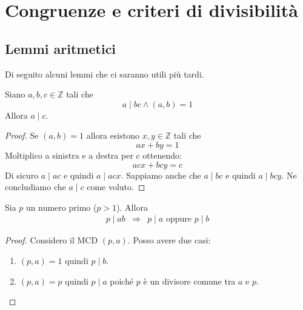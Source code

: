 \section{Congruenze e criteri di divisibilit\`a}

\subsection{Lemmi aritmetici}
Di seguito alcuni lemmi che ci saranno utili pi\`u tardi.

\begin{lemma}
	Siano $a, b, c \in \mathbb{Z}$ tali che
	\begin{equation*}
		a \mid bc \wedge (a, b) = 1
	\end{equation*}
	Allora $a \mid c$.
	\begin{proof}
		Se $(a, b) = 1$ allora esistono $x, y \in \mathbb{Z}$ tali che
		\begin{equation*}
			ax + by = 1
		\end{equation*}
		Moltiplico a sinistra e a destra per $c$ ottenendo:
		\begin{equation*}
			acx + bcy = c
		\end{equation*}
		Di sicuro $a \mid ac$ e quindi $a \mid acx$. Sappiamo anche che $a \mid bc$ e quindi
		$a \mid bcy$. Ne concludiamo che $a \mid c$ come voluto.
	\end{proof}
\end{lemma}

\begin{lemma}
	Sia $p$ un numero primo ($p > 1$). Allora
	\begin{equation*}
		\begin{array}{lll}
			p \mid ab & \Rightarrow & p \mid a \text{ oppure } p \mid b
		\end{array}
	\end{equation*}
	\begin{proof}
		Considero il MCD $(p, a)$. Posso avere due casi:
		\begin{enumerate}
			\item $(p, a) = 1$ quindi $p \mid b$.
			\item $(p, a) = p$ quindi $p \mid a$ poich\'e $p$ \`e un divisore comune tra
			      $a$ e $p$.
		\end{enumerate}
	\end{proof}
\end{lemma}

